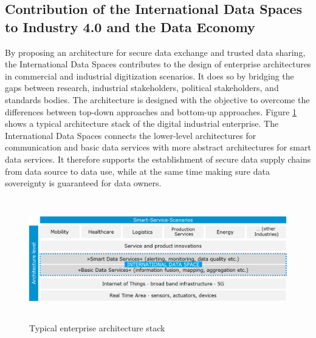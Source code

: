 \subsection{Contribution of the International Data Spaces to Industry 4.0 and the Data Economy}\label{subsec:contribution_to_industry40}
By proposing an architecture for secure data exchange and trusted data sharing, the International Data Spaces contributes to the design of enterprise architectures in commercial and industrial digitization scenarios. It does so by bridging the gaps between research, industrial stakeholders, political stakeholders, and standards bodies. The architecture is designed with the objective to overcome the differences between top-down approaches and bottom-up approaches. Figure \ref{fig:5_Typical_enterprise_architecture_stack} shows a typical architecture stack of the digital industrial enterprise. The International Data Spaces connects the lower-level architectures for communication and basic data services with more abstract architectures for smart data services. It therefore supports the establishment of secure data supply chains from data source to data use, while at the same time making sure data sovereignty is guaranteed for data owners.




\begin{figure}[h]
	\begin{Center}
		\includegraphics[width=6.25in,height=2.09in]{./media/image16.png}
		\caption{ Typical enterprise architecture stack}
		\label{fig:5_Typical_enterprise_architecture_stack}
	\end{Center}
\end{figure}





